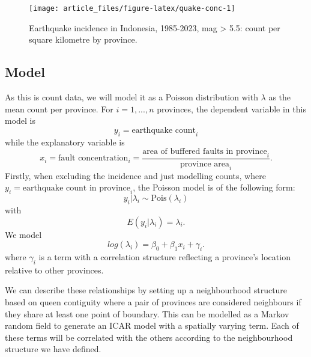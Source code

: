 \begin{figure}

{\centering \texttt{[image: article\_files/figure-latex/quake-conc-1]} 

}

\caption{Earthquake incidence in Indonesia, 1985-2023, mag > 5.5: count per square kilometre by province. }\label{fig:quake-conc}
\end{figure}

\hypertarget{model}{%
\subsection{Model}\label{model}}

As this is count data, we will model it as a Poisson distribution with
\(\lambda\) as the mean count per province. For \(i = 1,...,n\) provinces,
the dependent variable in this model is
\begin{equation}
y_i = \text{earthquake count}_i 
\label{eq:eq1}
\end{equation}
while the explanatory variable is
\begin{equation}
x_i = \text{fault concentration}_i = \frac{\text{area of buffered faults in province}_i} {\text{province area}_i}.
\label{eq:eq2}
\end{equation}
Firstly, when excluding the incidence and just modelling counts, where
\(y_i = \text{earthquake count in province}_i\), the Poisson model is of
the following form:
\begin{equation}
y_i | \lambda_i \sim \text{Pois}(\lambda_i)
\label{eq:eq3}
\end{equation}
with
\begin{equation}
E(y_i | \lambda_i) = \lambda_i.
\label{eq:eq4}
\end{equation}
We model
\begin{equation}
log(\lambda_i) = \beta_0 + \beta_1x_i + \gamma_i.
\label{eq:eq5}
\end{equation}
where \(\gamma_i\)
is a term with a correlation structure reflecting a province's location
relative to other provinces.

We can describe these relationships by setting up a neighbourhood
structure based on queen contiguity where a pair of provinces are
considered neighbours if they share at least one point of boundary. This can be modelled as a Markov random field to generate an ICAR model with a spatially varying term. Each of these terms will be correlated with the others according to the neighbourhood structure we have defined.

